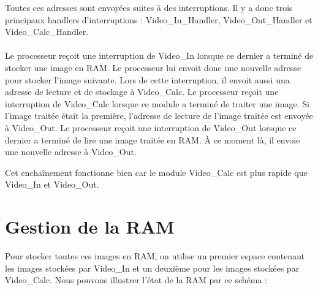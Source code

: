 \documentclass[a4paper,12pt]{report}
\begin{document}
{{{		Toutes ces adresses sont envoyées suites à des interruptions.
		  Il y a donc trois principaux handlers d'interruptions : Video\_In\_Handler, Video\_Out\_Handler et Video\_Calc\_Handler. \\ \\

		  Le processeur reçoit une interruption de Video\_In lorsque ce dernier a terminé de stocker une image en RAM. Le processeur lui envoit donc une nouvelle adresse pour stocker l'image suivante. Lors de cette interruption, il envoit aussi una adresse de lecture et de stockage à Video\_Calc.
		  Le processeur reçoit une interruption de Video\_Calc lorsque ce module a terminé de traiter une image. Si l'image traitée était la première, l'adresse de lecture de l'image traitée est envoyée à Video\_Out.
		  Le processeur reçoit une interruption de Video\_Out lorsque ce dernier a terminé de lire une image traitée en RAM. À ce moment là, il envoie une nouvelle adresse à Video\_Out.

		  Cet enchaînement fonctionne bien car le module Video\_Calc est plus rapide que Video\_In et Video\_Out.

	 }
	 \section{Gestion de la RAM}
	 {
		Pour stocker toutes ces images en RAM, on utilise un premier espace contenant les images stockées par Video\_In et un deuxième pour les images stockées par Video\_Calc. Nous pouvons illustrer l'état de la RAM par ce schéma :

}}}
\end{document}
